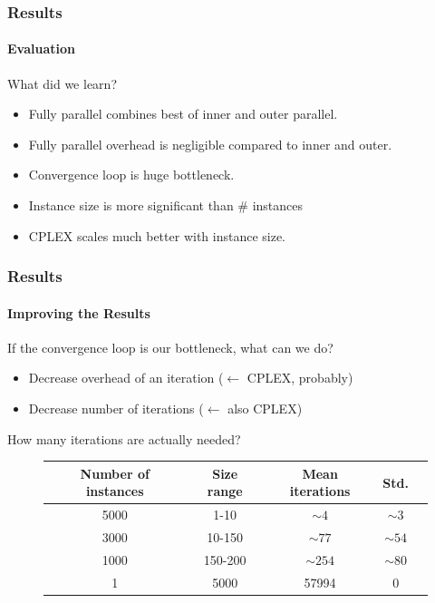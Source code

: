 \documentclass{beamer}
\renewcommand{\emph}[1]{\textcolor{structure}{#1}}
\begin{document}
\begin{frame}
\frametitle{Results}
\framesubtitle{Evaluation}
\centering
{\Large What did we learn?}

\begin{itemize}
\item Fully parallel combines best of inner and outer parallel.
\item Fully parallel overhead is negligible compared to inner and outer.
\pause
\item Convergence loop is huge bottleneck.
\item Instance size is more significant than \# instances
\item CPLEX scales much better with instance size.
\end{itemize}

\end{frame}

\begin{frame}
\frametitle{Results}
\framesubtitle{Improving the Results}
If the convergence loop is our bottleneck, what can we do?

\begin{itemize}
\item Decrease overhead of an iteration {\tiny($\leftarrow$ CPLEX, probably)}
\item Decrease number of iterations {\tiny($\leftarrow$ also CPLEX)}
\end{itemize}

\pause
How many iterations are actually needed?
\begin{figure}
\begin{tabular}{|c|c|c|c|c|}
\hline
\emph{\textbf{Number of instances}} & \emph{\textbf{Size range}} & \emph{\textbf{Mean iterations}} & \emph{\textbf{Std.}} \\\hline
5000 & 1-10 & $\sim 4$ & $\sim 3$ \\\hline
3000 & 10-150 & $\sim 77$ & $\sim 54$ \\\hline
1000 & 150-200 & $\sim 254$ & $\sim 80$ \\\hline
1 & 5000 & 57994 & 0 \\\hline
\end{tabular}
\end{figure}
\end{frame}
\end{document}
